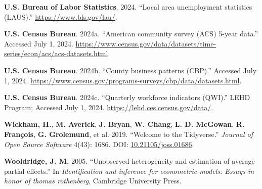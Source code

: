 \documentclass[
]{article}
\newlength{\cslhangindent}
\newenvironment{CSLReferences}[2] %
 {\begin{list}{}{%
  \setlength{\itemindent}{0pt}
  \setlength{\leftmargin}{0pt}
  \setlength{\parsep}{0pt}
  \ifodd #1
   \setlength{\leftmargin}{\cslhangindent}
   \setlength{\itemindent}{-1\cslhangindent}
  \fi
  \setlength{\itemsep}{#2\baselineskip}}}
 {\end{list}}
\begin{document}
\begin{CSLReferences}{1}{0}
\textbf{U.S. Bureau of Labor Statistics}. 2024. {``Local area
unemployment statistics ({LAUS}).''} \url{https://www.bls.gov/lau/}.

\textbf{U.S. Census Bureau}. 2024a. {``American community survey ({ACS})
5-year data.''} Accessed July 1, 2024.
\url{https://www.census.gov/data/datasets/time-series/econ/acs/acs-datasets.html}.

\textbf{U.S. Census Bureau}. 2024b. {``County business patterns
({CBP}).''} Accessed July 1, 2024.
\url{https://www.census.gov/programs-surveys/cbp/data/datasets.html}.

\textbf{U.S. Census Bureau}. 2024c. {``Quarterly workforce indicators
({QWI}).''} LEHD Program; Accessed July 1, 2024.
\url{https://lehd.ces.census.gov/data/}.

\textbf{Wickham, H.}, \textbf{M. Averick}, \textbf{J. Bryan}, \textbf{W.
Chang}, \textbf{L. D. McGowan}, \textbf{R. François}, \textbf{G.
Grolemund}, et al. 2019. {``Welcome to the {Tidyverse}.''} \emph{Journal
of Open Source Software} 4(43): 1686. DOI:
\href{https://doi.org/10.21105/joss.01686}{10.21105/joss.01686}.

\textbf{Wooldridge, J. M.} 2005. {``Unobserved heterogeneity and
estimation of average partial effects.''} In \emph{Identification and
inference for econometric models: Essays in honor of thomas rothenberg},
Cambridge University Press.

\end{CSLReferences}
\end{document}
